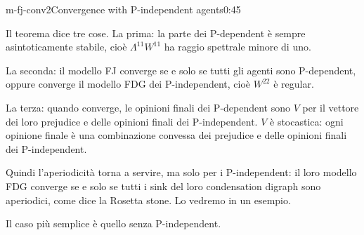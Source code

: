 \begin{slide}{m-fj-conv2}{Convergence with P-independent agents}{0:45}
  \begin{discorso}
    \item Il teorema dice tre cose. La prima: la parte dei P-dependent è sempre asintoticamente stabile, cioè $\Lambda^{11}W^{11}$ ha raggio spettrale minore di uno.
    \item La seconda: il modello FJ converge se e solo se tutti gli agenti sono P-dependent, oppure converge il modello FDG dei P-independent, cioè $W^{22}$ è regular.
    \item La terza: quando converge, le opinioni finali dei P-dependent sono $V$ per il vettore dei loro prejudice e delle opinioni finali dei P-independent. $V$ è stocastica: ogni opinione finale è una combinazione convessa dei prejudice e delle opinioni finali dei P-independent.
    \item Quindi l'aperiodicità torna a servire, ma solo per i P-independent: il loro modello FDG converge se e solo se tutti i sink del loro condensation digraph sono aperiodici, come dice la Rosetta stone. Lo vedremo in un esempio.
    \item Il caso più semplice è quello senza P-independent.
  \end{discorso}
\end{slide}

